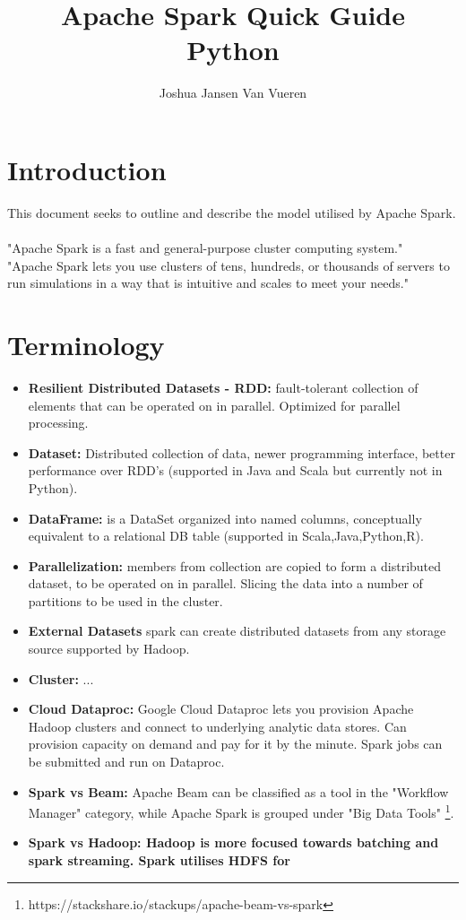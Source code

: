 \documentclass[english]{article}
\begin{document}
\title{Apache Spark Quick Guide \\
Python}


\author{Joshua Jansen Van Vueren}

\maketitle

\section*{Introduction}
This document seeks to outline and describe the model utilised by Apache Spark.
\\\\
"Apache Spark is a fast and general-purpose cluster computing system." 
\\
"Apache Spark lets you use clusters of tens, hundreds, or thousands of servers to run simulations in a way that is intuitive and scales to meet your needs."
\section{Terminology}
\begin{itemize}
\item \textbf{Resilient Distributed Datasets - RDD: } fault-tolerant collection of elements that can be operated on in parallel. Optimized for parallel processing.
\item \textbf{Dataset: } Distributed collection of data, newer programming interface, better performance over RDD's (supported in Java and Scala but currently not in Python).
\item \textbf{DataFrame: } is a DataSet organized into named columns, conceptually equivalent to a relational DB table (supported in Scala,Java,Python,R).
\item \textbf{Parallelization: } members from collection are copied to form a distributed dataset, to be operated on in parallel. Slicing the data into a number of partitions to be used in the cluster.
\item \textbf{External Datasets} spark can create distributed datasets from any storage source supported by Hadoop.
\item \textbf{Cluster: } ...
\item \textbf{Cloud Dataproc: } Google Cloud Dataproc lets you provision Apache Hadoop clusters and connect to underlying analytic data stores. Can provision capacity on demand and pay for it by the minute. Spark jobs can be submitted and run on Dataproc. 
\item \textbf{Spark vs Beam: } Apache Beam can be classified as a tool in the "Workflow Manager" category, while Apache Spark is grouped under "Big Data Tools" \footnote{https://stackshare.io/stackups/apache-beam-vs-spark}.
\item \textbf{Spark vs Hadoop: Hadoop is more focused towards batching and spark streaming. Spark utilises HDFS for}
\end{itemize}
\end{document}
